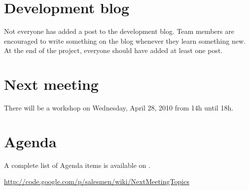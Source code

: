 \documentclass[a4paper, 12pt]{article}
\begin{document}
	\section{Development blog}
		Not everyone has added a post to the development blog. Team members are encouraged to write something on the blog whenever they learn something new. At the end of the project, everyone should have added at least one post.
		
	\section{Next meeting}
		There will be a workshop on Wednesday, April 28, 2010 from 14h until 18h.
		
	\section{Agenda}
A complete list of Agenda items is available on \cite{agendaitems}.\\
	
	\begin{thebibliography}{99}
		
		\href{http://code.google.com/p/salesmen/wiki/NextMeetingTopics}{http://code.google.com/p/salesmen/wiki/NextMeetingTopics}
		
	\end{thebibliography}	
		
\end{document}
